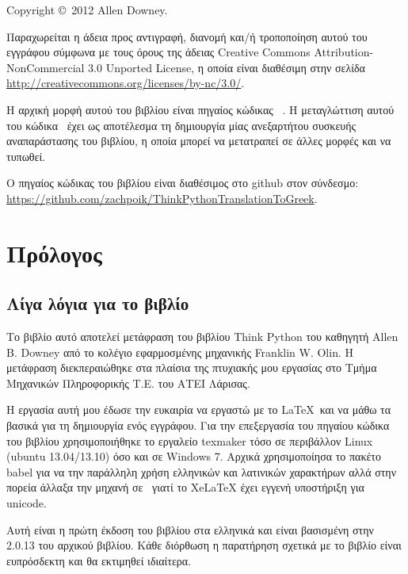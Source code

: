 \documentclass[10pt]{book}
\begin{document}
\pagebreak
\thispagestyle{empty}

{\small
Copyright \copyright ~2012 Allen Downey.


\vspace{0.2in}


Παραχωρείται η άδεια προς αντιγραφή, διανομή και/ή τροποποίηση αυτού του εγγράφου σύμφωνα με τους όρους της άδειας Creative Commons Attribution-NonCommercial 3.0 Unported License, η οποία είναι διαθέσιμη στην  σελίδα \url{http://creativecommons.org/licenses/by-nc/3.0/}.

Η αρχική μορφή αυτού του βιβλίου είναι πηγαίος κώδικας \XeLaTeX\ . Η μεταγλώττιση αυτού του κώδικα \XeLaTeX\ έχει ως αποτέλεσμα τη δημιουργία μίας ανεξαρτήτου συσκευής αναπαράστασης του βιβλίου, η οποία μπορεί να μετατραπεί σε άλλες μορφές και να τυπωθεί.

Ο πηγαίος κώδικας του βιβλίου είναι διαθέσιμος στο github στον σύνδεσμο: 
\url{https://github.com/zachpoik/ThinkPythonTranslationToGreek}.

\vspace{0.2in}

} %

\chapter{Πρόλογος}

\section*{Λίγα λόγια για το βιβλίο}

Το βιβλίο αυτό αποτελεί μετάφραση του βιβλίου Think Python του καθηγητή Allen B. Downey από το κολέγιο εφαρμοσμένης μηχανικής Franklin W. Olin. Η μετάφραση διεκπεραιώθηκε στα πλαίσια της πτυχιακής μου εργασίας στο Τμήμα Μηχανικών Πληροφορικής Τ.Ε. του ΑΤΕΙ Λάρισας. 

Η εργασία αυτή μου έδωσε την ευκαιρία να εργαστώ με το \LaTeX\ και να μάθω τα βασικά για τη δημιουργία ενός εγγράφου. Για την επεξεργασία του πηγαίου κώδικα του βιβλίου χρησιμοποιήθηκε το εργαλείο texmaker τόσο σε περιβάλλον Linux (ubuntu 13.04/13.10) όσο και σε Windows 7. Αρχικά χρησιμοποίησα το πακέτο babel για να την παράλληλη χρήση ελληνικών και λατινικών χαρακτήρων αλλά στην πορεία άλλαξα την μηχανή σε \XeTeX\ γιατί το XeLaTeX έχει εγγενή υποστήριξη για unicode. 

Αυτή είναι η πρώτη έκδοση του βιβλίου στα ελληνικά και είναι βασισμένη στην 2.0.13 του αρχικού βιβλίου. Κάθε διόρθωση η παρατήρηση σχετικά με το βιβλίο είναι ευπρόσδεκτη και θα εκτιμηθεί ιδιαίτερα.
\end{document}
